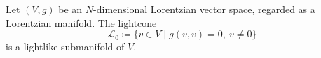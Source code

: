 Let $(V, g)$ be an $N$-dimensional Lorentzian vector space, regarded as a Lorentzian manifold. The lightcone
$$\mathcal{L}_0 \coloneqq \{ v \in V \mid g(v, v) = 0,\ v \neq 0 \}$$
is a lightlike submanifold of $V$.
